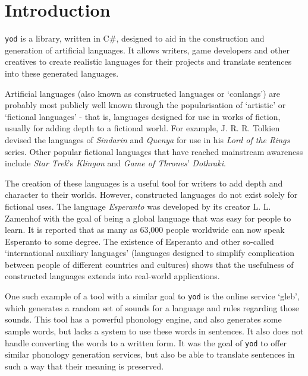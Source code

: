 \documentclass{report}
\newcommand{\Csh}{C{\lserif\#}}
\begin{document}
	\listoftables
   
   \chapter{Introduction}
   \label{chapter: introduction}
   \texttt{yod} is a library, written in \Csh{}, designed to aid in the construction and generation of artificial languages. It allows writers, game developers and other creatives to create realistic languages for their projects and translate sentences into these generated languages.
   
   Artificial languages (also known as constructed languages or `conlangs') are probably most publicly well known through the popularisation of `artistic' or `fictional languages' - that is, languages designed for use in works of fiction, usually for adding depth to a fictional world. For example, J. R. R. Tolkien devised the languages of \textit{Sindarin} and \textit{Quenya} for use in his \textit{Lord of the Rings} series. Other popular fictional languages that have reached mainstream awareness include \textit{Star Trek}'s \textit{Klingon} and \textit{Game of Thrones}' \textit{Dothraki}.
   
   The creation of these languages is a useful tool for writers to add depth and character to their worlds. However, constructed languages do not exist solely for fictional uses. The language \textit{Esperanto} was developed by its creator L. L. Zamenhof with the goal of being a global language that was easy for people to learn\cite{unualibro}. It is reported that as many as 63,000 people worldwide can now speak Esperanto to some degree\cite{esperanto}. The existence of Esperanto and other so-called `international auxiliary languages' (languages designed to simplify complication between people of different countries and cultures) shows that the usefulness of constructed languages extends into real-world applications.
   
   One such example of a tool with a similar goal to \texttt{yod} is the online service `gleb', which generates a random set of sounds for a language and rules regarding those sounds\cite{gleb}. This tool has a powerful phonology engine, and also generates some sample words, but lacks a system to use these words in sentences. It also does not handle converting the words to a written form. It was the goal of \texttt{yod} to offer similar phonology generation services, but also be able to translate sentences in such a way that their meaning is preserved.
   
\end{document}
